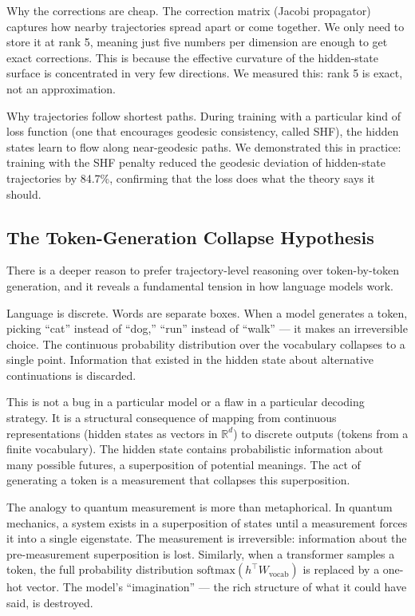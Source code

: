 \documentclass[11pt]{article}
\begin{document}
Why the corrections are cheap. The correction matrix (Jacobi
propagator) captures how nearby trajectories spread apart or come together.
We only need to store it at rank 5, meaning just five numbers per dimension
are enough to get exact corrections. This is because the effective curvature
of the hidden-state surface is concentrated in very few directions. We
measured this: rank 5 is exact, not an approximation.

Why trajectories follow shortest paths. During training with a
particular kind of loss function (one that encourages geodesic consistency,
called SHF), the hidden states learn to flow along near-geodesic paths. We
demonstrated this in practice: training with the SHF penalty reduced the
geodesic deviation of hidden-state trajectories by 84.7\%, confirming that
the loss does what the theory says it should.

\subsection{The Token-Generation Collapse Hypothesis}

There is a deeper reason to prefer trajectory-level reasoning over
token-by-token generation, and it reveals a fundamental tension in how
language models work.

Language is discrete. Words are separate boxes. When a model generates
a token, picking ``cat'' instead of ``dog,'' ``run'' instead of ``walk'' ---
it makes an irreversible choice. The continuous probability distribution
over the vocabulary collapses to a single point. Information that existed
in the hidden state about alternative continuations is discarded.

This is not a bug in a particular model or a flaw in a particular decoding
strategy. It is a structural consequence of mapping from continuous
representations (hidden states as vectors in $\mathbb{R}^d$) to discrete
outputs (tokens from a finite vocabulary). The hidden state contains
probabilistic information about many possible futures, a superposition of
potential meanings. The act of generating a token is a measurement that
collapses this superposition.

The analogy to quantum measurement is more than metaphorical. In quantum
mechanics, a system exists in a superposition of states until a measurement
forces it into a single eigenstate. The measurement is irreversible:
information about the pre-measurement superposition is lost. Similarly,
when a transformer samples a token, the full probability distribution
$\mathrm{softmax}(h^\top W_{\text{vocab}})$ is replaced by a one-hot
vector. The model's ``imagination'' --- the rich structure of what it
could have said, is destroyed.
\end{document}

